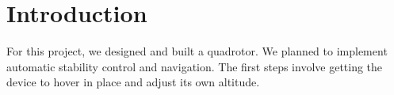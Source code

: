 \section{Introduction}

For this project, we designed and built a quadrotor.  We planned to implement automatic stability control and navigation.  The first steps involve getting the device to hover in place and adjust its own altitude.
